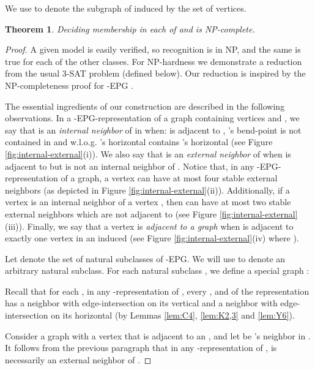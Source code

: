 \documentclass[11pt,3p,times]{elsarticle}
\newenvironment{myproof}{\begin{proof}}{\end{proof}}
\newtheorem{theorem}{Theorem}
\begin{document}
We use  to denote the subgraph of  induced by the set 
of vertices.

\begin{theorem}
Deciding membership in each of  and   is NP-complete.
\end{theorem}
\begin{myproof}
A given  model is easily verified, so  recognition
is in NP, and the same is true for each of the other classes.
For NP-hardness we demonstrate a reduction from the
usual 3-SAT problem (defined below). Our reduction is inspired by
the NP-completeness proof for -EPG \cite{Hel2010}.

The essential ingredients of our construction are described in the
following observations. In a -EPG-representation  of a
graph  containing vertices  and , we say that  is an
\emph{internal neighbor} of  in  when:  is adjacent to
, 's bend-point is not contained in  and w.l.o.g.
's horizontal contains 's horizontal (see Figure
\ref{fig:internal-external}(i)). We also say that  is an
\emph{external neighbor} of  when  is adjacent to  but
 is not an internal neighbor of . Notice that, in any
-EPG-representation of a graph, a vertex can have at most four
stable external neighbors (as depicted in Figure
\ref{fig:internal-external}(ii)). Additionally, if a vertex  is
an internal neighbor of a vertex , then  can have at most
two stable external neighbors which are not adjacent to  (see
Figure \ref{fig:internal-external}(iii)). Finally, we say that a
vertex  is \emph{adjacent to a graph } when  is adjacent to
exactly one vertex in an induced  (see Figure
\ref{fig:internal-external}(iv) where ).

Let  denote
the set of natural subclasses of -EPG.  We will use  to denote
an arbitrary natural subclass.  For each natural subclass
, we define a special graph :
  

Recall that for each , in any
-representation of , every ,  and
 of the representation has a neighbor with edge-intersection on
its vertical and a neighbor with edge-intersection on its horizontal (by
Lemmas \ref{lem:C4}, \ref{lem:K2,3} and \ref{lem:Y6}).

Consider a graph  with a vertex  that is adjacent to an
, and let  be 's neighbor in . It follows
from the previous paragraph that in any -representation of ,  is
necessarily an external neighbor of .


\end{myproof}
\end{document}
